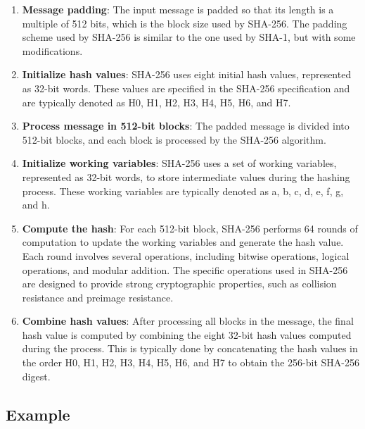 \documentclass[openany]{book}
\begin{document}
\begin{enumerate}
    \item \textbf{Message padding}: The input message is padded so that its length is a multiple of 512 bits, which is the block size used by SHA-256. The padding scheme used by SHA-256 is similar to the one used by SHA-1, but with some modifications.

    \item \textbf{Initialize hash values}: SHA-256 uses eight initial hash values, represented as 32-bit words. These values are specified in the SHA-256 specification and are typically denoted as H0, H1, H2, H3, H4, H5, H6, and H7.

    \item \textbf{Process message in 512-bit blocks}: The padded message is divided into 512-bit blocks, and each block is processed by the SHA-256 algorithm.

    \item \textbf{Initialize working variables}: SHA-256 uses a set of working variables, represented as 32-bit words, to store intermediate values during the hashing process. These working variables are typically denoted as a, b, c, d, e, f, g, and h.

    \item \textbf{Compute the hash}: For each 512-bit block, SHA-256 performs 64 rounds of computation to update the working variables and generate the hash value. Each round involves several operations, including bitwise operations, logical operations, and modular addition. The specific operations used in SHA-256 are designed to provide strong cryptographic properties, such as collision resistance and preimage resistance.

    \item \textbf{Combine hash values}: After processing all blocks in the message, the final hash value is computed by combining the eight 32-bit hash values computed during the process. This is typically done by concatenating the hash values in the order H0, H1, H2, H3, H4, H5, H6, and H7 to obtain the 256-bit SHA-256 digest.
\end{enumerate}

\subsection{Example}
\end{document}

